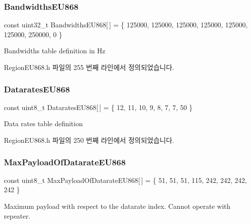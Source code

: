 \subsubsection{\texorpdfstring{Bandwidths\+E\+U868}{BandwidthsEU868}}
{\footnotesize\ttfamily const uint32\+\_\+t Bandwidths\+E\+U868\mbox{[}$\,$\mbox{]} = \{ 125000, 125000, 125000, 125000, 125000, 125000, 250000, 0 \}\hspace{0.3cm}{\ttfamily [static]}}

Bandwidths table definition in Hz 

Region\+E\+U868.\+h 파일의 255 번째 라인에서 정의되었습니다.

\mbox{\label{group___r_e_g_i_o_n_e_u868_gaacd1013fb42b2c19f701b3540798f690}} 
\subsubsection{\texorpdfstring{Datarates\+E\+U868}{DataratesEU868}}
{\footnotesize\ttfamily const uint8\+\_\+t Datarates\+E\+U868\mbox{[}$\,$\mbox{]} = \{ 12, 11, 10, 9, 8, 7, 7, 50 \}\hspace{0.3cm}{\ttfamily [static]}}

Data rates table definition 

Region\+E\+U868.\+h 파일의 250 번째 라인에서 정의되었습니다.

\mbox{\label{group___r_e_g_i_o_n_e_u868_gac370ccd4a63001a3b9dcfeac869fbbb2}} 
\subsubsection{\texorpdfstring{Max\+Payload\+Of\+Datarate\+E\+U868}{MaxPayloadOfDatarateEU868}}
{\footnotesize\ttfamily const uint8\+\_\+t Max\+Payload\+Of\+Datarate\+E\+U868\mbox{[}$\,$\mbox{]} = \{ 51, 51, 51, 115, 242, 242, 242, 242 \}\hspace{0.3cm}{\ttfamily [static]}}

Maximum payload with respect to the datarate index. Cannot operate with repeater. 

